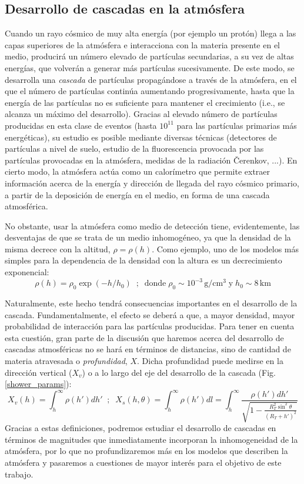 \documentclass[12 pt, a4paper]{article} %
\numberwithin{equation}{section}
\numberwithin{figure}{section}
\numberwithin{table}{section}
\begin{document}
\subsection{Desarrollo de cascadas en la atmósfera}\label{sec21}

Cuando un rayo cósmico de muy alta energía (por ejemplo un protón) llega a las capas superiores de la atmósfera e interacciona con la materia presente en el medio, producirá un número elevado de partículas secundarias, a su vez de altas energías, que volverán a generar más partículas sucesivamente. De este modo, se desarrolla una \textit{cascada} de partículas propagándose a través de la atmósfera, en el que el número de partículas continúa aumentando progresivamente, hasta que la energía de las partículas no es suficiente para mantener el crecimiento (i.e., se alcanza un máximo del desarrollo). Gracias al elevado número de partículas producidas en esta clase de eventos (hasta $10^{11}$ para las partículas primarias más energéticas), su estudio es posible mediante diversas técnicas (detectores de partículas a nivel de suelo, estudio de la fluorescencia provocada por las partículas provocadas en la atmósfera, medidas de la radiación \v{C}erenkov, ...). En cierto modo, la atmósfera actúa como un calorímetro que permite extraer información acerca de la energía y dirección de llegada del rayo cósmico primario, a partir de la deposición de energía en el medio, en forma de una cascada atmosférica.

No obstante, usar la atmósfera como medio de detección tiene, evidentemente, las desventajas de que se trata de un medio inhomogéneo, ya que la densidad de la misma decrece con la altitud, $\rho = \rho(h)$. Como ejemplo, uno de los modelos más simples para la dependencia de la densidad con la altura es un decrecimiento exponencial:
\begin{equation}
	\rho(h)=\rho_0\exp\left(-h/h_0\right)\; \;;\;\;\text{donde}\;\rho_0\sim 10^{-3}\,\mathrm{g/cm^3}\;\text{y}\;h_0\sim8\,\mathrm{km}\label{ec21}
\end{equation}

Naturalmente, este hecho tendrá consecuencias importantes en el desarrollo de la cascada. Fundamentalmente, el efecto se deberá a que, a mayor densidad, mayor probabilidad de interacción para las partículas producidas. Para tener en cuenta esta cuestión, gran parte de la discusión que haremos acerca del desarrollo de cascadas atmosféricas no se hará en términos de distancias, sino de cantidad de materia atravesada o \textit{profundidad}, $X$. Dicha profundidad puede medirse en la dirección vertical ($X_v$) o a lo largo del eje del desarrollo de la cascada (Fig. \ref{shower_params}):
\begin{equation}
	X_v(h)=\int_{h}^\infty\rho(h')dh'\;\;;\;\;X_s(h,\theta)=\int_{h}^\infty\rho(h')dl=\int_h^{\infty}\frac{\rho(h')dh'}{\sqrt{1-\frac{R_T^2\sin^2{\theta}}{\left(R_T+h'\right)^2}}}\label{ec22}
\end{equation}
Gracias a estas definiciones, podremos estudiar el desarrollo de cascadas en términos de magnitudes que inmediatamente incorporan la inhomogeneidad de la atmósfera, por lo que no profundizaremos más en los modelos que describen la atmósfera y pasaremos a cuestiones de mayor interés para el objetivo de este trabajo.
\end{document}
